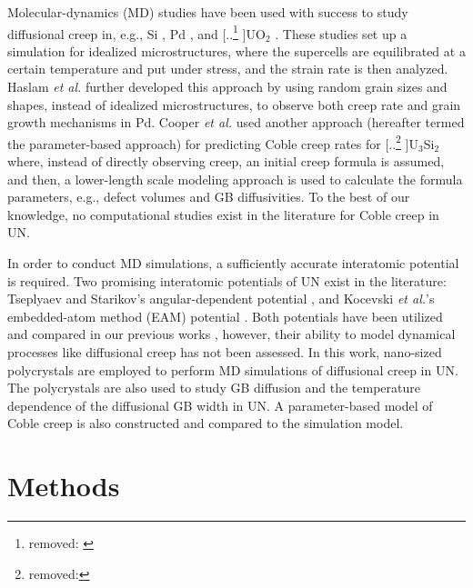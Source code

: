 \documentclass[preprint,12pt,sort&compress]{elsarticle} %
\newcommand{\?}{\stackrel{?}{=}}
\providecommand{\DIFaddtex}[1]{{\sf #1}} %
\providecommand{\DIFdeltex}[1]{{[..\footnote{removed: #1} ]}} %
\providecommand{\DIFaddbegin}{\protect\color{blue}} %
\providecommand{\DIFaddend}{\protect\color{black}} %
\providecommand{\DIFdelbegin}{\protect\color{red}} %
\providecommand{\DIFdelend}{\protect\color{black}} %
\providecommand{\DIFadd}[1]{\texorpdfstring{\DIFaddtex{#1}}{#1}} %
\providecommand{\DIFdel}[1]{\texorpdfstring{\DIFdeltex{#1}}{}} %
\newcommand{\DIFscaledelfig}{0.5}
\newlength{\DIFdelgraphicswidth} %
\newlength{\DIFdelgraphicsheight} %
\newcommand{\DIFaddincludegraphics}[2][]{{\color{blue}\fbox{\DIFOincludegraphics[#1]{#2}}}} %
\newcommand{\DIFdelincludegraphics}[2][]{%
\sbox{\DIFdelgraphicsbox}{\DIFOincludegraphics[#1]{#2}}%
\settoboxwidth{\DIFdelgraphicswidth}{\DIFdelgraphicsbox} %
\settoboxtotalheight{\DIFdelgraphicsheight}{\DIFdelgraphicsbox} %
\scalebox{\DIFscaledelfig}{%
\parbox[b]{\DIFdelgraphicswidth}{\usebox{\DIFdelgraphicsbox}\\[-\baselineskip] \rule{\DIFdelgraphicswidth}{0em}}\llap{\resizebox{\DIFdelgraphicswidth}{\DIFdelgraphicsheight}{%
\setlength{\unitlength}{\DIFdelgraphicswidth}%
\begin{picture}(1,1)%
\thicklines\linethickness{2pt} %
{\color[rgb]{1,0,0}\put(0,0){\framebox(1,1){}}}%
{\color[rgb]{1,0,0}\put(0,0){\line( 1,1){1}}}%
{\color[rgb]{1,0,0}\put(0,1){\line(1,-1){1}}}%
\end{picture}%
}\hspace*{3pt}}} %
} %
\DeclareRobustCommand{\DIFaddbegin}{\DIFOaddbegin \let\includegraphics\DIFaddincludegraphics} %
\DeclareRobustCommand{\DIFaddend}{\DIFOaddend \let\includegraphics\DIFOincludegraphics} %
\DeclareRobustCommand{\DIFdelbegin}{\DIFOdelbegin \let\includegraphics\DIFdelincludegraphics} %
\DeclareRobustCommand{\DIFdelend}{\DIFOaddend \let\includegraphics\DIFOincludegraphics} %
\begin{document}

Molecular-dynamics (MD) studies have been used with success to study diffusional creep in, e.g., Si \cite{Keblinski1998}, Pd \cite{Yamakov2002}, and \DIFdelbegin \DIFdel{ \cite{Desai2008, Galvin2024b}}\DIFdelend \DIFaddbegin \DIFadd{UO$_2$ \cite{Desai2008, Galvin2025}}\DIFaddend . These studies set up a simulation for idealized microstructures, where the supercells are equilibrated at a certain temperature and put under stress, and the strain rate is then analyzed. Haslam \textit{et al.} \cite{Haslam2004} further developed this approach by using random grain sizes and shapes, instead of idealized microstructures, to observe both creep rate and grain growth mechanisms in Pd. Cooper \textit{et al.} \cite{Cooper2021} used another approach (hereafter termed the parameter-based approach) for predicting Coble creep rates for \DIFdelbegin \DIFdel{ }\DIFdelend \DIFaddbegin \DIFadd{U$_3$Si$_2$ }\DIFaddend where, instead of directly observing creep, an initial creep formula is assumed, and then, a lower-length scale modeling approach is used to calculate the formula parameters, e.g., defect volumes and GB diffusivities. To the best of our knowledge, no computational studies exist in the literature for Coble creep in UN.

In order to conduct MD simulations, a sufficiently accurate interatomic potential is required. Two promising interatomic potentials of UN exist in the literature: Tseplyaev and Starikov's angular-dependent potential \cite{Tseplyaev2016}, and Kocevski \textit{et al.}'s embedded-atom method (EAM) potential \cite{Kocevski2022II}. Both potentials have been utilized and compared in our previous works \cite{AbdulHameed2024, AbdulHameed2024b}, however, their ability to model dynamical processes like diffusional creep has not been assessed. In this work, nano-sized polycrystals are employed to perform MD simulations of diffusional creep in UN. The polycrystals are also used to study GB diffusion and the temperature dependence of the diffusional GB width in UN. A parameter-based model of Coble creep is also constructed and compared to the simulation model. %

\section{Methods}
\end{document}
